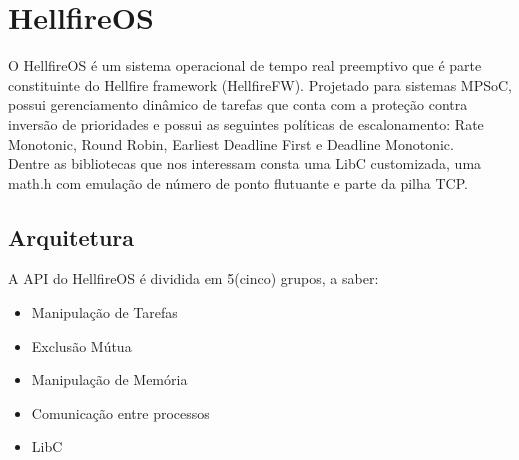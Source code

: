 \section{HellfireOS}
\label{sec:HellfireOS}
O HellfireOS é um sistema operacional de tempo real preemptivo que é parte constituinte
do Hellfire framework (HellfireFW). Projetado para sistemas MPSoC, possui gerenciamento
dinâmico de tarefas que conta com a proteção contra inversão de prioridades e possui as
seguintes políticas de escalonamento:
Rate Monotonic, Round Robin, Earliest Deadline First e Deadline Monotonic.\\
Dentre as bibliotecas que nos interessam consta uma LibC customizada, uma math.h com emulação
de número de ponto flutuante e parte da pilha TCP.
\subsection{Arquitetura}
A API do HellfireOS é dividida em 5(cinco) grupos, a saber:
\begin{itemize}
	\item Manipulação de Tarefas
	\item Exclusão Mútua
	\item Manipulação de Memória
	\item Comunicação entre processos
	\item LibC
\end{itemize}
